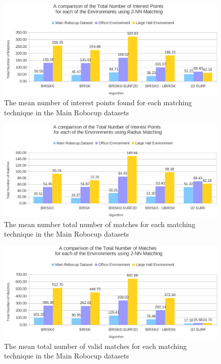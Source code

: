 \documentclass{report}
\begin{document}
 \begin{figure}%
  \centering
    \includegraphics[width=1.0\textwidth]{../Drawings/Graphs/overall_tn_ip.pdf}
    \caption{The mean number of interest points found for each matching technique in the Main Robocup datasets} 
    \label{fig:overall_tn_ip}
 \end{figure}
 
\begin{figure}
  \centering
    \includegraphics[width=1.0\textwidth]{../Drawings/Graphs/overall_tn_ip_radius.pdf}
    \caption{The mean number total number of matches for each matching technique in the Main Robocup datasets} 
    \label{fig:overall_tn_ip_radius}
\end{figure}

\begin{figure}
  \centering
    \includegraphics[width=1.0\textwidth]{../Drawings/Graphs/overall_tnm.pdf}
    \caption{The mean total number of valid matches for each matching technique in the Main Robocup datasets} 
    \label{fig:overall_tnm}
\end{figure}
\end{document}
